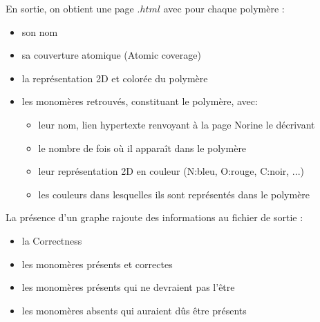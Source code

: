 \documentclass[11pt, a4paper]{report}
\begin{document}
	En sortie, on obtient une page $.html$ avec pour chaque polymère :
	\begin{itemize}
		\item son nom
		\item sa couverture atomique (Atomic coverage)
		\item la représentation 2D et colorée du polymère
		\item les monomères retrouvés, constituant le polymère, avec: 
		\begin{itemize}
			\item leur nom, lien hypertexte renvoyant à la page Norine le décrivant
			\item le nombre de fois où il apparaît dans le polymère
			\item leur représentation 2D en couleur (N:bleu, O:rouge, C:noir, ...)
			\item les couleurs dans lesquelles ils sont représentés dans le polymère
		\end{itemize}
	\end{itemize}
	
	La présence d'un graphe rajoute des informations au fichier de sortie :
	\begin{itemize}
		\item la Correctness
		\item les monomères présents et correctes
		\item les monomères présents qui ne devraient pas l'être
		\item les monomères absents qui auraient dûs être présents
	\end{itemize}
	
\end{document}
